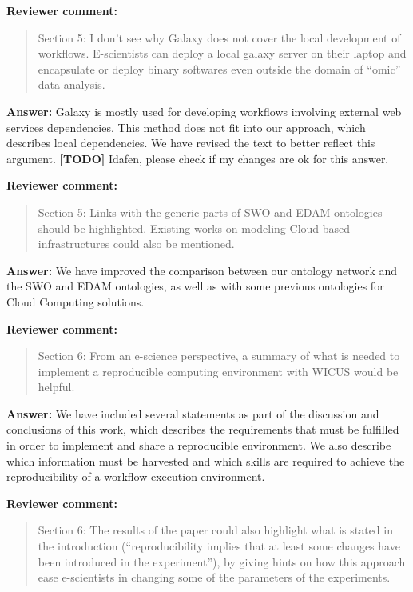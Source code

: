 \documentclass{letter}
\newenvironment{review}%
{\textbf{Reviewer comment:}\begin{quote}}%
{\end{quote}}%
\newcommand{\todo}[1]{%
      \color{red}\textbf{[TODO]} #1\color{black}}
\newcommand{\answer}[1]{%
      \textbf{Answer:} #1}
\begin{document}
\begin{letter}{}
\begin{review}
Section 5: I don't see why Galaxy does not cover the local development of workflows. E-scientists can deploy a local galaxy server on their laptop and encapsulate or deploy binary softwares even outside the domain of ``omic'' data analysis.
\end{review}

\answer{Galaxy is mostly used for developing workflows involving external web services dependencies. This method does not fit into our approach, which describes local dependencies. We have revised the text to better reflect this argument.} \todo{Idafen, please check if my changes are ok for this answer.}


\begin{review}
Section 5: Links with the generic parts of SWO and EDAM ontologies should be highlighted. Existing works on modeling Cloud based infrastructures could also be mentioned.
\end{review}

\answer{We have improved the comparison between our ontology network and the SWO and EDAM ontologies, as well as with some previous ontologies for Cloud Computing solutions.}


\begin{review}
Section 6: From an e-science perspective, a summary of what is needed to implement a reproducible computing environment with WICUS would be helpful.
\end{review}

\answer{We have included several statements as part of the discussion and conclusions of this work, which describes the requirements that must be fulfilled in order to implement and share a reproducible environment. We also describe which information must be harvested and which skills are required to achieve the reproducibility of a workflow execution environment.}


\begin{review}
Section 6: The results of the paper could also highlight what is stated in the introduction (``reproducibility implies that at least some changes have been introduced in the experiment''), by giving hints on how this approach ease e-scientists in changing some of the parameters of the experiments.
\end{review}


\end{letter}
\end{document}
